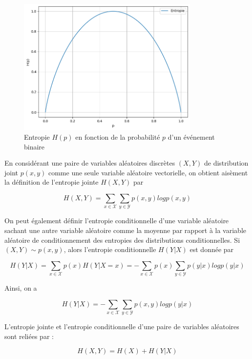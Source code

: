 \begin{figure}[!ht]
    \centering
    \includegraphics[width=9cm]{exemple_entropie.png}
    \caption{Entropie $H(p)$ en fonction de la probabilité $p$ d'un événement binaire}
    \label{fig4.5}
\end{figure}

En considérant une paire de variables aléatoires discrètes $(X,Y)$ de distribution joint $p(x,y)$ comme une seule variable aléatoire vectorielle, on obtient aisèment la définition de l'entropie jointe $H(X,Y)$ par

\begin{equation}
    H(X,Y) = \sum_{x \in \mathcal{X}}\sum_{y \in \mathcal{Y}}p(x, y)logp(x,y)
\end{equation}

On peut également définir l'entropie conditionnelle d'une variable aléatoire sachant une autre variable aléatoire comme la moyenne par rapport à la variable aléatoire de conditionnement des entropies des distributions conditionnelles.
Si $(X,Y) \sim p(x,y)$, alors l'entropie conditionnelle $H(Y|X)$ est donnée par 

\begin{equation}
    H(Y|X) = \sum_{x \in \mathcal{X}}p(x)H(Y|X=x) = -\sum_{x \in \mathcal{X}}p(x)\sum_{y \in \mathcal{Y}}p(y|x)logp(y|x)
\end{equation}

Ainsi, on a

\begin{equation}
    H(Y|X) = -\sum_{x \in \mathcal{X}}\sum_{y \in \mathcal{Y}}p(x,y)logp(y|x)
\end{equation}

L'entropie jointe et l'entropie conditionnelle d'une paire de variables aléatoires sont reliées par :

\begin{equation}
    H(X,Y) = H(X) + H(Y|X)
\end{equation}

